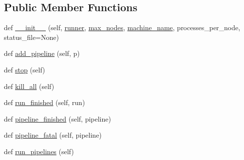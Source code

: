 \subsection*{Public Member Functions}
\begin{DoxyCompactItemize}
\item 
def \hyperlink{classcodar_1_1savanna_1_1consumer_1_1_pipeline_runner_acf72709f2d294ec9c1136d7ef72d06e4}{\+\_\+\+\_\+init\+\_\+\+\_\+} (self, \hyperlink{classcodar_1_1savanna_1_1consumer_1_1_pipeline_runner_ac2602829f52e9355326fe46748d38e4b}{runner}, \hyperlink{classcodar_1_1savanna_1_1consumer_1_1_pipeline_runner_af0633cf5cd30b71a59f7a5fce860df56}{max\+\_\+nodes}, \hyperlink{classcodar_1_1savanna_1_1consumer_1_1_pipeline_runner_a7f2a92cc8626dbbef1e585178162ddaa}{machine\+\_\+name}, processes\+\_\+per\+\_\+node, status\+\_\+file=None)
\item 
def \hyperlink{classcodar_1_1savanna_1_1consumer_1_1_pipeline_runner_a861447c8086329814e32c709a713f624}{add\+\_\+pipeline} (self, p)
\item 
def \hyperlink{classcodar_1_1savanna_1_1consumer_1_1_pipeline_runner_a62bc31b0b57c9062d05fac14fb50b9b4}{stop} (self)
\item 
def \hyperlink{classcodar_1_1savanna_1_1consumer_1_1_pipeline_runner_a5d7432a5e1b57fa669dbc7391de3c881}{kill\+\_\+all} (self)
\item 
def \hyperlink{classcodar_1_1savanna_1_1consumer_1_1_pipeline_runner_a059b4a5e2c63e6e893a2f1c7862967b3}{run\+\_\+finished} (self, run)
\item 
def \hyperlink{classcodar_1_1savanna_1_1consumer_1_1_pipeline_runner_a4fd8b1e73906734e53fe137f6d808be3}{pipeline\+\_\+finished} (self, pipeline)
\item 
def \hyperlink{classcodar_1_1savanna_1_1consumer_1_1_pipeline_runner_ad8891e29ad84031b9b162b2a7cef918e}{pipeline\+\_\+fatal} (self, pipeline)
\item 
def \hyperlink{classcodar_1_1savanna_1_1consumer_1_1_pipeline_runner_af1fe6b71b44a5e849052a36643444db3}{run\+\_\+pipelines} (self)
\end{DoxyCompactItemize}
